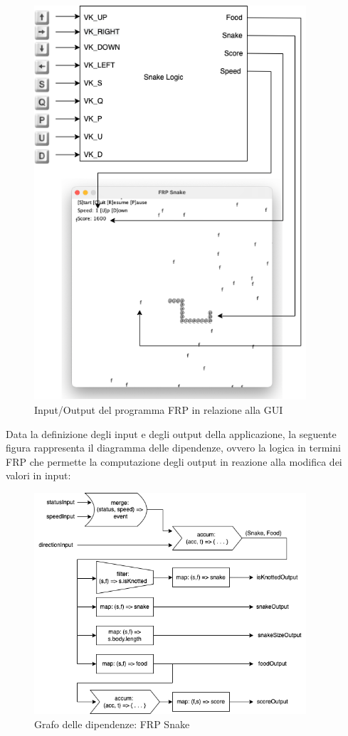 \documentclass[../main.tex]{subfiles}
\begin{document}
\begin{figure}[H]
\centering
\includegraphics[width=0.9\textwidth]{img/frp-scala-Page-2.drawio.png}
\caption{Input/Output del programma FRP in relazione alla GUI}
\end{figure}

Data la definizione degli input e degli output della applicazione, la seguente figura rappresenta il diagramma delle dipendenze, ovvero la logica in termini FRP che permette la computazione degli output in reazione alla modifica dei valori in input:
\begin{figure}[H]
\centering
\includegraphics[width=0.9\textwidth]{img/frp-scala-Page-5.drawio.png}
\caption{Grafo delle dipendenze: FRP Snake}
\end{figure}
\end{document}
